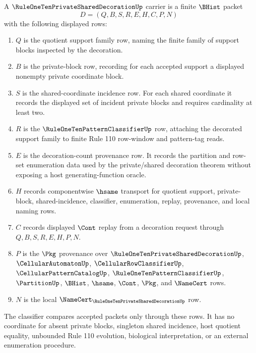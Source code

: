 \begin{definition}
\label{def:rule-one-ten-private-shared-decoration-carrier}
A $\RuleOneTenPrivateSharedDecorationUp$ carrier is a finite $\BHist$ packet
$$
D=(Q,B,S,R,E,H,C,P,N)
$$
with the following displayed rows:
\begin{enumerate}
\item $Q$ is the quotient support family row, naming the finite family of support blocks inspected by the decoration.
\item $B$ is the private-block row, recording for each accepted support a displayed nonempty private coordinate block.
\item $S$ is the shared-coordinate incidence row. For each shared coordinate it records the displayed set of incident private blocks and requires cardinality at least two.
\item $R$ is the $\RuleOneTenPatternClassifierUp$ row, attaching the decorated support family to finite Rule 110 row-window and pattern-tag reads.
\item $E$ is the decoration-count provenance row. It records the partition and row-set enumeration data used by the private/shared decoration theorem without exposing a host generating-function oracle.
\item $H$ records componentwise $\hsame$ transport for quotient support, private-block, shared-incidence, classifier, enumeration, replay, provenance, and local naming rows.
\item $C$ records displayed $\Cont$ replay from a decoration request through $Q,B,S,R,E,H,P,N$.
\item $P$ is the $\Pkg$ provenance over $\RuleOneTenPrivateSharedDecorationUp$, $\CellularAutomatonUp$, $\CellularRowClassifierUp$, $\CellularPatternCatalogUp$, $\RuleOneTenPatternClassifierUp$, $\PartitionUp$, $\BHist$, $\hsame$, $\Cont$, $\Pkg$, and $\NameCert$ rows.
\item $N$ is the local $\NameCert_{\RuleOneTenPrivateSharedDecorationUp}$ row.
\end{enumerate}
The classifier compares accepted packets only through these rows. It has no coordinate for absent private blocks, singleton shared incidence, host quotient equality, unbounded Rule 110 evolution, biological interpretation, or an external enumeration procedure.
\end{definition}

